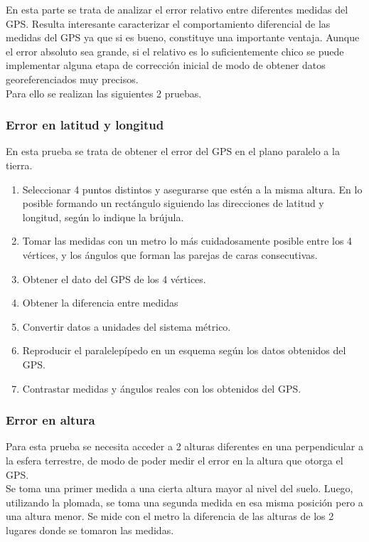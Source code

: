 \documentclass[spanish,12pt,a4paper,titlepage]{report}
\begin{document}
En esta parte se trata de analizar el error relativo entre diferentes medidas del GPS. Resulta interesante caracterizar el comportamiento diferencial de las medidas del GPS ya que si es bueno, constituye una importante ventaja. Aunque el error absoluto sea grande, si el relativo es lo suficientemente chico se puede implementar alguna etapa de corrección inicial de modo de obtener datos georeferenciados muy precisos.\\
Para ello se realizan las siguientes 2 pruebas.

\subsubsection*{Error en latitud y longitud}

En esta prueba se trata de obtener el error del GPS en el plano paralelo a la tierra.

\begin{enumerate} 
	\item Seleccionar 4 puntos distintos y asegurarse que estén a la misma altura. En lo posible formando un rectángulo siguiendo las direcciones de latitud y longitud, según lo indique la brújula.
	\item Tomar las medidas con un metro lo más cuidadosamente posible entre los 4 vértices, y los ángulos que forman las parejas de caras consecutivas.
	\item Obtener el dato del GPS de los 4 vértices.
	\item Obtener la diferencia entre medidas
	\item Convertir datos a unidades del sistema métrico.
	\item Reproducir el paralelepípedo en un esquema según los datos obtenidos del GPS.
	\item Contrastar medidas y ángulos reales con los obtenidos del GPS.
\end{enumerate} 

\subsubsection*{Error en altura}

Para esta prueba se necesita acceder a 2 alturas diferentes en una perpendicular a la esfera terrestre, de modo de poder medir el error en la altura que otorga el GPS.\\

Se toma una primer medida a una cierta altura mayor al nivel del suelo. Luego, utilizando la plomada, se toma una segunda medida en esa misma posición pero a una altura menor. Se mide con el metro la diferencia de las alturas de los 2 lugares donde se tomaron las medidas.\\
\end{document}
